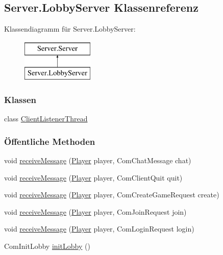 \hypertarget{a00054}{\subsection{Server.\-Lobby\-Server Klassenreferenz}
\label{a00054}
}
Klassendiagramm für Server.\-Lobby\-Server\-:\begin{figure}[H]
\begin{center}
\leavevmode
\includegraphics[height=2.000000cm]{a00054}
\end{center}
\end{figure}
\subsubsection*{Klassen}
\begin{DoxyCompactItemize}
\item 
class \hyperlink{a00011}{Client\-Listener\-Thread}
\end{DoxyCompactItemize}
\subsubsection*{Öffentliche Methoden}
\begin{DoxyCompactItemize}
\item 
void \hyperlink{a00054_ad240485402c357285d02709a08525d90}{receive\-Message} (\hyperlink{a00073}{Player} player, Com\-Chat\-Message chat)
\item 
void \hyperlink{a00054_a545d275e96d490093936496ef0c425d0}{receive\-Message} (\hyperlink{a00073}{Player} player, Com\-Client\-Quit quit)
\item 
void \hyperlink{a00054_a9c388e6df37f5c8263a4e3b54eb228ef}{receive\-Message} (\hyperlink{a00073}{Player} player, Com\-Create\-Game\-Request create)
\item 
void \hyperlink{a00054_aa636ef5ce845b8749bac73dabc5d8e74}{receive\-Message} (\hyperlink{a00073}{Player} player, Com\-Join\-Request join)
\item 
void \hyperlink{a00054_ac7ea664a020d82bb65372524a4fbeafb}{receive\-Message} (\hyperlink{a00073}{Player} player, Com\-Login\-Request login)
\item 
Com\-Init\-Lobby \hyperlink{a00054_a8f3543587bb516bbfa3cc5f3b087e3ac}{init\-Lobby} ()
\end{DoxyCompactItemize}


